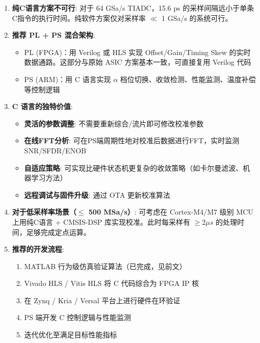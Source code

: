 \documentclass[UTF8,a4paper,11pt]{ctexart}
\begin{document}
\begin{enumerate}
    \item \textbf{纯C语言方案不可行}: 对于 64 GSa/s TIADC，15.6 ps 的采样间隔远小于单条C指令的执行时间。纯软件方案仅对采样率 $\ll$ 1 GSa/s 的系统可行。

    \item \textbf{推荐 PL + PS 混合架构}: 
    \begin{itemize}
        \item PL (FPGA)：用 Verilog 或 HLS 实现 Offset/Gain/Timing Skew 的实时数据通路。这部分与原始 ASIC 方案基本一致，可直接复用 Verilog 代码
        \item PS (ARM)：用 C 语言实现 $\alpha$ 档位切换、收敛检测、性能监测、温度补偿等控制逻辑
    \end{itemize}

    \item \textbf{C 语言的独特价值}:
    \begin{itemize}
        \item \textbf{灵活的参数调整}: 不需要重新综合/流片即可修改校准参数
        \item \textbf{在线FFT分析}: 可在PS端周期性地对校准后数据进行FFT，实时监测 SNR/SFDR/ENOB
        \item \textbf{自适应策略}: 可实现比硬件状态机更复杂的收敛策略（如卡尔曼滤波、机器学习方法）
        \item \textbf{远程调试与固件升级}: 通过 OTA 更新校准算法
    \end{itemize}

    \item \textbf{对于低采样率场景（$\le$ 500 MSa/s）}: 可考虑在 Cortex-M4/M7 级别 MCU 上用纯C语言 + CMSIS-DSP 库实现校准。此时每采样有 $\ge 2 \mu s$ 的处理时间，足够完成定点运算。

    \item \textbf{推荐的开发流程}:
    \begin{enumerate}
        \item MATLAB 行为级仿真验证算法（已完成，见前文）
        \item Vivado HLS / Vitis HLS 将 C 代码综合为 FPGA IP 核
        \item 在 Zynq / Kria / Versal 平台上进行硬件在环验证
        \item PS 端开发 C 控制逻辑与性能监测
        \item 迭代优化至满足目标性能指标
    \end{enumerate}
\end{enumerate}
\end{document}

